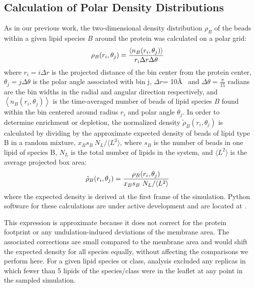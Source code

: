 \subsection{Calculation of Polar Density Distributions}
As in our previous work\cite{Sharp2019, Woods2019, Tong2019}, the two-dimensional density distribution $\rho_{B}$ of the beads within a given lipid species $B$ around the protein was calculated on a polar grid:
  \begin{equation}
      \rho_{B}(r_i,\theta_j)= \frac{\left\langle n_{B}(r_i,\theta_j) \right\rangle}{r_i \Delta{r}\Delta{\theta}} \\        
    \label{eq:R}
  \end{equation}
  where  $r_i = i \Delta{r}$ is the projected distance of the bin center from the protein center, $\theta_j = j \Delta{\theta}$ is the polar angle associated with bin j,  $\Delta{r}$= 10\AA~ and  $\Delta{\theta} = \frac{\pi}{15}$ radians are the bin widths in the radial and angular direction respectively, and $\left\langle n_{B}(r_i,\theta_j) \right\rangle$ is the time-averaged number of beads of lipid species $B$ found within the bin centered around radius $r_{i}$ and polar angle $\theta_{j}$.  In order to determine enrichment or depletion, the normalized density $ \tilde{\rho}_{B}(r_i,\theta_j)$ is calculated by dividing by the approximate expected density of beads of lipid type B in a random mixture, $x_{B}s_{B}~N_{L}/\langle L^{2}\rangle$, where $s_{B}$ is the number of beads in one lipid of species B, $N_{L}$ is the total number of lipids in the system, and $\langle L^{2}\rangle$ is the average projected box area:
  \begin{equation}
  \tilde{\rho}_{B}(r_i,\theta_j)=\frac{ \rho_{B}(r_i,\theta_j)}{x_{B}s_{B}~N_{L}/\langle L^{2}\rangle} \\        
    \label{eq:Rt}
  \end{equation}
where the expected density is derived at the first frame of the simulation. Python software for these calculations are under active development and are located at \cite{2Dgithub}.  
 
This expression is approximate because it does not correct for the protein footprint or any undulation-induced deviations of the membrane area.  The associated corrections are small compared to the membrane area and would shift the expected density for all species equally, without affecting the comparisons we perform here. For a given lipid species or class, analysis excluded any replicas in which fewer than 5 lipids of the species/class were in the leaflet at any point in the sampled simulation.

